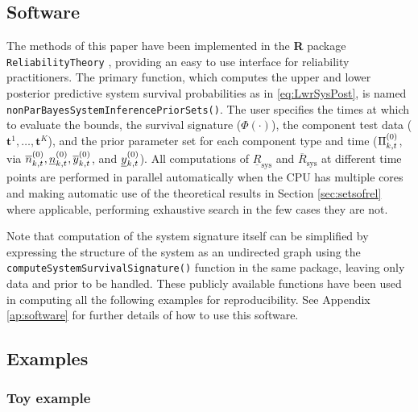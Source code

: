 \documentclass[12pt, a4paper]{elsarticle}
\newcommand{\bs}[1]{\boldsymbol{#1}}
\renewcommand{\vec}[1]{{\bs#1}}
\newcommand{\ul}[1]{\underline{#1}}
\newcommand{\ol}[1]{\overline{#1}}
\newcommand{\lRsys}{\ul{R}_\text{sys}}
\newcommand{\uRsys}{\ol{R}_\text{sys}}
\begin{document}
\subsection{Software}

The methods of this paper have been implemented in the \textbf{R}
\citep{R} package \texttt{ReliabilityTheory} \citep{2015:aslett-RT},
providing an easy to use interface for reliability practitioners.  The
primary function, which computes the upper and lower posterior
predictive system survival probabilities as in \eqref{eq:LwrSysPost}, is
named \texttt{nonParBayesSystemInferencePriorSets()}.  The user
specifies the times at which to evaluate the bounds, the survival
signature ($\Phi(\cdot)$), the component test data ($\vec{t}^1, \ldots,
\vec{t}^K$), and the prior parameter set for each component type and
time ($\Pi^{(0)}_{k,t}$, via $\nzu_{k,t}, \nzl_{k,t}, \yzu_{k,t}$, and
$\yzl_{k,t}$).  All computations of $\lRsys$
and $\uRsys$ at different time points are performed in parallel
automatically when the CPU has multiple cores and making automatic
use of the theoretical results in Section \ref{sec:setsofrel} where
applicable, performing exhaustive search in the few cases they are not.

Note that computation of the system signature itself can be simplified by
expressing the structure of the system as an undirected graph using the
\texttt{computeSystemSurvivalSignature()} function in the same package,
leaving only data and prior to be handled.  These publicly available
functions have been used in computing all the following examples for
reproducibility.  See Appendix \ref{ap:software} for further details of how to use this software.

\subsection{Examples}

\subsubsection{Toy example}
\end{document}
